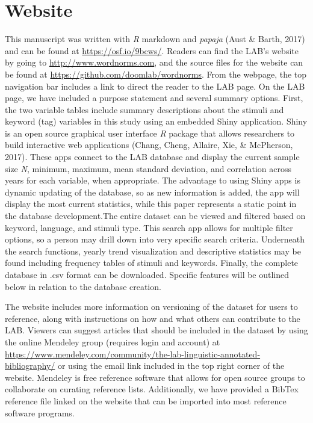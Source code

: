 \documentclass[english,,man]{apa6}
\theoremstyle{definition}
\theoremstyle{definition}
\theoremstyle{definition}
\theoremstyle{remark}
\begin{document}
\hypertarget{website}{%
\section{Website}\label{website}}

This manuscript was written with \emph{R} markdown and \emph{papaja}
(Aust \& Barth, 2017) and can be found at \url{https://osf.io/9bcws/}.
Readers can find the LAB's website by going to
\url{http://www.wordnorms.com}, and the source files for the website can
be found at \url{https://github.com/doomlab/wordnorms}. From the
webpage, the top navigation bar includes a link to direct the reader to
the LAB page. On the LAB page, we have included a purpose statement and
several summary options. First, the two variable tables include summary
descriptions about the stimuli and keyword (tag) variables in this study
using an embedded Shiny application. Shiny is an open source graphical
user interface \emph{R} package that allows researchers to build
interactive web applications (Chang, Cheng, Allaire, Xie, \& McPherson,
2017). These apps connect to the LAB database and display the current
sample size \emph{N}, minimum, maximum, mean standard deviation, and
correlation across years for each variable, when appropriate. The
advantage to using Shiny apps is dynamic updating of the database, so as
new information is added, the app will display the most current
statistics, while this paper represents a static point in the database
development.The entire dataset can be viewed and filtered based on
keyword, language, and stimuli type. This search app allows for multiple
filter options, so a person may drill down into very specific search
criteria. Underneath the search functions, yearly trend visualization
and descriptive statistics may be found including frequency tables of
stimuli and keywords. Finally, the complete database in .csv format can
be downloaded. Specific features will be outlined below in relation to
the database creation.

The website includes more information on versioning of the dataset for
users to reference, along with instructions on how and what others can
contribute to the LAB. Viewers can suggest articles that should be
included in the dataset by using the online Mendeley group (requires
login and account) at
\url{https://www.mendeley.com/community/the-lab-linguistic-annotated-bibliography/}
or using the email link included in the top right corner of the website.
Mendeley is free reference software that allows for open source groups
to collaborate on curating reference lists. Additionally, we have
provided a BibTex reference file linked on the website that can be
imported into most reference software programs.
\end{document}
